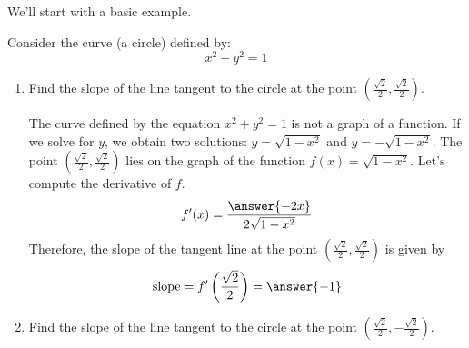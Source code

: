 \documentclass{ximera}
\begin{document}
  
  We'll start with a basic example.
  \begin{example}
Consider the curve (a circle) defined by:
\[
x^2 + y^2 = 1
\]
\begin{enumerate}

\item Find the slope of the line tangent to the circle at the point $\left(\frac{\sqrt{2}}{2},\frac{\sqrt{2}}{2}\right)$.
\begin{explanation}
\begin{image}
    \end{image}

The curve defined by the equation  $x^2 + y^2 = 1$ is not a graph of a function. If we solve for $y$, we obtain two solutions:
$y=\sqrt{1-x^2}$ and $y=-\sqrt{1-x^2}$. 
The point $\left(\frac{\sqrt{2}}{2},\frac{\sqrt{2}}{2}\right)$ lies on the graph of the function $f(x)=\sqrt{1-x^2}$.
Let's compute the derivative of $f$.
\[
f'(x)=\frac{\answer{-2x}}{2\sqrt{1-x^2}}
\]
Therefore, the slope of the tangent line at the point $\left(\frac{\sqrt{2}}{2},\frac{\sqrt{2}}{2}\right)$ is given by
\[
\text{slope}=f'\left(\frac{\sqrt{2}}{2}\right)=\answer{-1}
\]
  \end{explanation}
\item Find the slope of the line tangent to the circle at the point $\left(\frac{\sqrt{2}}{2},-\frac{\sqrt{2}}{2}\right)$.


\end{enumerate}
\end{example}
\end{document}
